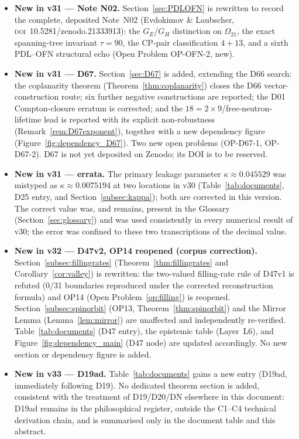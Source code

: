 \documentclass[11pt,a4paper]{article}
\theoremstyle{plain}
\theoremstyle{definition}
\theoremstyle{remark}
\begin{document}
\begin{itemize}
\item \textbf{New in v31 --- Note N02.} Section~\ref{sec:PDLOFN} is rewritten to record the complete, deposited Note~N02 (Evdokimov \& Laubscher, \textsc{doi}~10.5281/zenodo.21333913): the $G_E$/$G_H$ distinction on $\Omega_{21}$, the exact spanning-tree invariant $\tau=90$, the CP-pair classification $4+13$, and a sixth PDL--OFN structural echo (Open Problem OP-OFN-2, new).
\item \textbf{New in v31 --- D67.} Section~\ref{sec:D67} is added, extending the D66 search: the coplanarity theorem (Theorem~\ref{thm:coplanarity}) closes the D66 vector-construction route; six further negative constructions are reported; the D01 Compton-closure erratum is corrected; and the $18=2\times9$/free-neutron-lifetime lead is reported with its explicit non-robustness (Remark~\ref{rem:D67exponent}), together with a new dependency figure (Figure~\ref{fig:dependency_D67}). Two new open problems (OP-D67-1, OP-D67-2). D67 is not yet deposited on Zenodo; its DOI is to be reserved.
\item \textbf{New in v31 --- errata.} The primary leakage parameter $\kappa\approx0.045529$ was mistyped as $\kappa\approx0.0075194$ at two locations in v30 (Table~\ref{tab:documents}, D25 entry, and Section~\ref{subsec:kappa}); both are corrected in this version. The correct value was, and remains, present in the Glossary (Section~\ref{sec:glossary}) and was used consistently in every numerical result of v30; the error was confined to these two transcriptions of the decimal value.
\item \textbf{New in v32 --- D47v2, OP14 reopened (corpus correction).} Section~\ref{subsec:fillingrates} (Theorem~\ref{thm:fillingrates} and Corollary~\ref{cor:valley}) is rewritten: the two-valued filling-rate rule of D47v1 is refuted (0/31 boundaries reproduced under the corrected reconstruction formula) and OP14 (Open Problem~\ref{op:filling}) is reopened. Section~\ref{subsec:spinorbit} (OP13, Theorem~\ref{thm:spinorbit}) and the Mirror Lemma (Lemma~\ref{lem:mirror}) are unaffected and independently re-verified. Table~\ref{tab:documents} (D47 entry), the epistemic table (Layer~L6), and Figure~\ref{fig:dependency_main} (D47 node) are updated accordingly. No new section or dependency figure is added.

\item \textbf{New in v33 --- D19ad.} Table~\ref{tab:documents} gains a new entry (D19ad, immediately following D19). No dedicated theorem section is added, consistent with the treatment of D19/D20/DN elsewhere in this document: D19ad remains in the philosophical register, outside the C1--C4 technical derivation chain, and is summarised only in the document table and this abstract.


\end{itemize}
\end{document}
